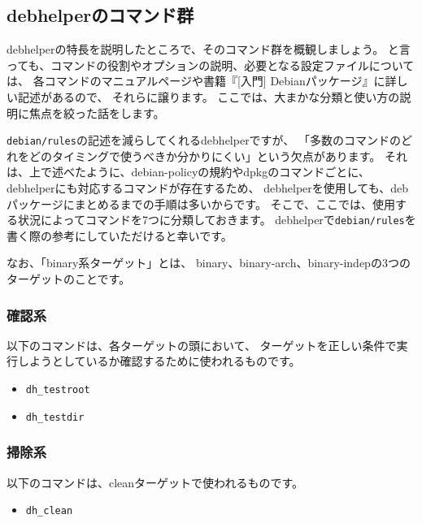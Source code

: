 \documentclass[mingoth,a4paper]{jsarticle}
\begin{document}


\subsection{debhelperのコマンド群}

debhelperの特長を説明したところで、そのコマンド群を概観しましょう。
と言っても、コマンドの役割やオプションの説明、必要となる設定ファイルについては、
各コマンドのマニュアルページや書籍『[入門] Debianパッケージ』に詳しい記述があるので、
それらに譲ります。
ここでは、大まかな分類と使い方の説明に焦点を絞った話をします。

\texttt{debian/rules}の記述を減らしてくれるdebhelperですが、
「多数のコマンドのどれをどのタイミングで使うべきか分かりにくい」という欠点があります。
それは、上で述べたように、debian-policyの規約やdpkgのコマンドごとに、
debhelperにも対応するコマンドが存在するため、
debhelperを使用しても、debパッケージにまとめるまでの手順は多いからです。
そこで、ここでは、使用する状況によってコマンドを7つに分類しておきます。
debhelperで\texttt{debian/rules}を書く際の参考にしていただけると幸いです。

なお、「binary系ターゲット」とは、
binary、binary-arch、binary-indepの3つのターゲットのことです。

\subsubsection{確認系}

以下のコマンドは、各ターゲットの頭において、
ターゲットを正しい条件で実行しようとしているか確認するために使われるものです。

\begin{itemize}
 \item \texttt{dh\_testroot}
 \item \texttt{dh\_testdir}
\end{itemize}

\subsubsection{掃除系}

以下のコマンドは、cleanターゲットで使われるものです。

\begin{itemize}
 \item \texttt{dh\_clean}
\end{itemize}
\end{document}
